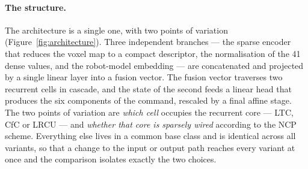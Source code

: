 \paragraph{The structure.}
The architecture is a single one, with two points of variation
(Figure~\ref{fig:architecture}). Three
independent branches --- the sparse encoder that reduces the voxel map to a
compact descriptor, the normalisation of the \num{41} dense values, and the
robot-model embedding --- are concatenated and projected by a single linear
layer into a fusion vector. The fusion vector traverses two recurrent cells in
cascade, and the state of the second feeds a linear head that produces the six
components of the command, rescaled by a final affine stage. The two points of
variation are \emph{which cell} occupies the recurrent core --- LTC, CfC or
LRCU --- and \emph{whether that core is sparsely wired} according to the NCP
scheme. Everything else lives in a common base class and is identical across all
variants, so that a change to the input or output path reaches every variant at
once and the comparison isolates exactly the two choices.

